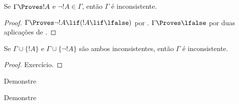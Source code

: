 \documentclass[../../../include/open-logic-section]{subfiles}
\begin{document}
\begin{prop}
  Se $\Gamma \Proves !A$ e $\lnot !A \in \Gamma$, então $\Gamma$ é
  inconsistente.
\end{prop}

\begin{proof}
  $\Gamma \Proves \lnot !A \lif (!A \lif \lfalse)$ por .
  $\Gamma \Proves \lfalse$ por duas aplicações de .
\end{proof}


\begin{prop}
  Se $\Gamma \cup \{!A\}$ e $\Gamma \cup \{\lnot !A\}$ são ambos
  inconsistentes, então $\Gamma$ é inconsistente.
\end{prop}

\begin{proof}
Exercício.
\end{proof}

\begin{prob}
  Demonstre 
\end{prob}
\tagendprob

\begin{prob}
  Demonstre 
\end{prob}
\tagendprob
\end{document}
